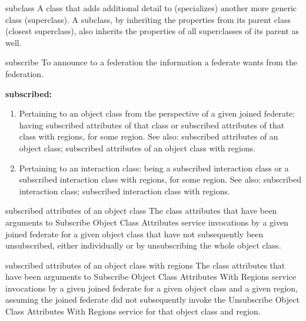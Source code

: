 \newpage
\begin{definition}{subclass}
    A class that adds additional detail to (specializes) another more generic class (superclass). A subclass, by inheriting the properties from its parent class (closest superclass), also inherits the properties of all superclasses of its parent as well.
\end{definition}

\begin{definition}{subscribe}
    To announce to a federation the information a federate wants from the federation.
\end{definition}

\par\noindent\textbf{subscribed:}\par

\begin{enumerate}[label=\alph*)]
\item Pertaining to an object class from the perspective of a given joined federate: having subscribed attributes of that class or subscribed attributes of that class with regions, for some region. See also: subscribed attributes of an object class; subscribed attributes of an object class with regions.
\item Pertaining to an interaction class: being a subscribed interaction class or a subscribed interaction class with regions, for some region. See also: subscribed interaction class; subscribed interaction class with regions.
\end{enumerate}

\begin{definition}{subscribed attributes of an object class}
    The class attributes that have been arguments to Subscribe Object Class Attributes service invocations by a given joined federate for a given object class that have not subsequently been unsubscribed, either individually or by unsubscribing the whole object class.
\end{definition}


\begin{definition}{subscribed attributes of an object class with regions}
    The class attributes that have been arguments to Subscribe Object Class Attributes With Regions service invocations by a given joined federate for a given object class and a given region, assuming the joined federate did not subsequently invoke the Unsubscribe Object Class Attributes With Regions service for that object class and region.
\end{definition}

